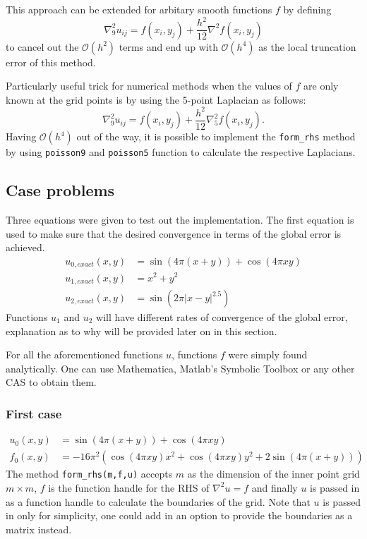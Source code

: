 \documentclass[main.tex]{subfiles}
\begin{document}
This approach can be extended for arbitary smooth functions $f$ by defining
\begin{equation}
    \nabla_9^2 u_{ij} = f(x_i, y_j) + \frac{h^2}{12} \nabla^2 f(x_i, y_j)
\end{equation}
to cancel out the $\mathcal{O}(h^2)$ terms and end up with $\mathcal{O}(h^4)$ as the local truncation error of this method. 

Particularly useful trick for numerical methods when the values of $f$ are only known at the grid points is by using the 5-point Laplacian as follows:
\begin{equation}
    \nabla_9^2 u_{ij} = f(x_i, y_j) + \frac{h^2}{12} \nabla_5^2 f(x_i, y_j).
\end{equation}
Having $\mathcal{O}(h^4)$ out of the way, it is possible to implement the \texttt{form\_rhs} method by using \texttt{poisson9} and \texttt{poisson5} function to calculate the respective Laplacians.

\subsection{Case problems}
Three equations were given to test out the implementation. The first equation is used to make sure that the desired convergence in terms of the global error is achieved.
\begin{align}
    u_{0,exact}(x,y) &= \sin(4 \pi (x + y)) + \cos(4 \pi x y) \\
    u_{1,exact}(x,y) &= x^2 + y^2 \\
    u_{2,exact}(x,y) &= \sin(2 \pi |x - y|^{2.5})
\end{align}
Functions $u_1$ and $u_2$ will have different rates of convergence of the global error, explanation as to why will be provided later on in this section.

For all the aforementioned functions $u$, functions $f$ were simply found analytically. One can use Mathematica, Matlab's Symbolic Toolbox or any other CAS to obtain them.

\subsubsection*{First case}
\begin{align}
    u_{0}(x,y) &= \sin(4 \pi (x + y)) + \cos(4 \pi x y) \\
    f_0(x,y) &= -16 \pi^2 \left(\cos(4 \pi x y) x^2 + \cos(4 \pi x y) y^2 + 2\sin(4 \pi (x+y))\right) 
\end{align}
The method \texttt{form\_rhs(m,f,u)} accepts $m$ as the dimension of the inner point grid $m \times m$, $f$ is the function handle for the RHS of $\nabla^2 u = f$ and finally $u$ is passed in as a function handle to calculate the boundaries of the grid. Note that $u$ is passed in only for simplicity, one could add in an option to provide the boundaries as a matrix instead.
\end{document}
